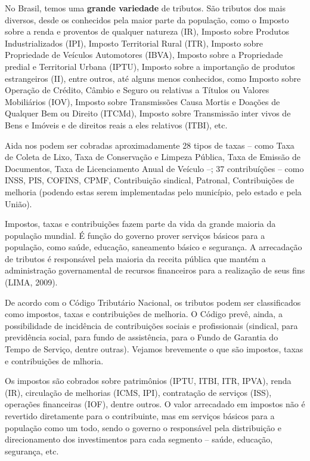 \begin{knowledge}
No Brasil, temos uma \textbf{grande variedade} de tributos. São tributos dos mais diversos, desde os conhecidos pela maior parte da população, como o Imposto sobre a renda e proventos de qualquer natureza (IR), Imposto sobre Produtos Industrializados (IPI), Imposto Territorial Rural (ITR), Imposto sobre Propriedade de Veículos Automotores (IBVA), Imposto sobre a Propriedade predial e Territorial Urbana (IPTU), Imposto sobre a importanção de produtos estrangeiros (II), entre outros, até alguns menos conhecidos, como Imposto sobre Operação de Crédito, Câmbio e Seguro ou relativas a Títulos ou Valores Mobiliários (IOV), Imposto sobre Transmissões Causa Mortis e Doações de Qualquer Bem ou Direito (ITCMd), Imposto sobre Transmissão inter vivos de Bens e Imóveis e de direitos reais a eles relativos (ITBI), etc.

Aida nos podem ser cobradas aproximadamente 28 tipos de taxas -- como Taxa de Coleta de Lixo, Taxa de Conservação e Limpeza Pública, Taxa de Emissão de Documentos, Taxa de Licenciamento Anual de Veículo --; 37 contribuíções -- como INSS, PIS, COFINS, CPMF, Contribuição sindical, Patronal, Contribuições de melhoria (podendo estas serem implementadas pelo município, pelo estado e pela União).
\end{knowledge}


Impostos, taxas e contribuições fazem parte da vida da grande maioria da população mundial. É função do governo prover serviços básicos para a população, como saúde, educação, saneamento básico e segurança. A arrecadação de tributos é responsável pela maioria da receita pública que mantém a administração governamental de recursos financeiros para a realização de seus fins (LIMA, 2009).

De acordo com o Código Tributário Nacional, os tributos podem ser classificados como impostos, taxas e contribuições de melhoria. O Código prevê, ainda, a possibilidade de incidência de contribuições sociais e profissionais (sindical, para previdência social, para fundo de assistência, para o Fundo de Garantia do Tempo de Serviço, dentre outras). Vejamos brevemente o que são impostos, taxas e contribuições de mlhoria.

Os impostos são cobrados sobre patrimônios (IPTU, ITBI, ITR, IPVA), renda (IR), circulação de melhorias (ICMS, IPI), contratação de serviços (ISS), operações financeiras (IOF), dentre outros. O valor arrecadado em impostos não é revertido diretamente para o contribuinte, mas em serviços básicos para a população como um todo, sendo o governo o responsável pela distribuição e direcionamento dos investimentos para cada segmento -- saúde, educação, segurança, etc.

